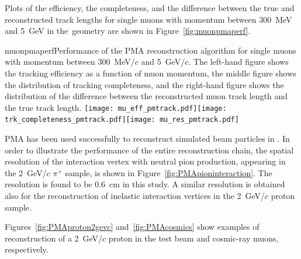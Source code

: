 Plots of the efficiency, the completeness, and the  difference between the true and reconstructed
track lengths for single muons with momentum between 300~MeV and 5~GeV in the~\pdsp geometry are
shown in Figure~\ref{fig:muonpmaperf}.  

\begin{cdrfigure}{muonpmaperf}{Performance of the PMA reconstruction algorithm for single muons with 
momentum between 300~MeV$/c$ and 5~GeV/$c$.  The left-hand figure shows the tracking efficiency as a function of
muon momentum, the middle figure shows the distribution of tracking completeness, and the right-hand figure shows the
distribution of the difference between the reconstructed muon track length and the true track length.}
\texttt{[image: mu\_eff\_pmtrack.pdf]}\texttt{[image: trk\_completeness\_pmtrack.pdf]}\texttt{[image: mu\_res\_pmtrack.pdf]}
\end{cdrfigure}

PMA has been used successfully to reconstruct simulated beam particles in
\pdsp. In order to illustrate the performance of the entire reconstruction chain,
the spatial resolution of the interaction vertex with neutral pion
production, appearing in the 2~GeV/$c$ $\pi^+$ sample, is shown in Figure~\ref{fig:PMApioninteraction}.
The resolution is found to be 0.6~cm in this study.
A similar resolution is obtained also for the reconstruction
of inelastic interaction vertices in the 2~GeV/$c$ proton sample. 


Figures~\ref{fig:PMAproton2gevc}
and~\ref{fig:PMAcosmics} show examples of reconstruction of a 2~GeV/$c$ proton in the test beam and
cosmic-ray muons, respectively.

